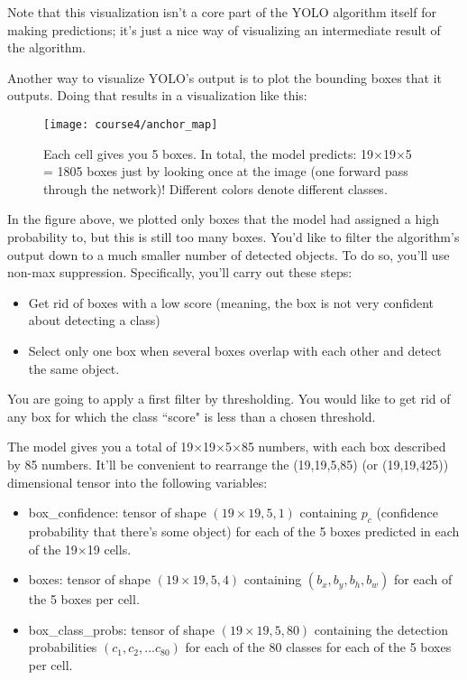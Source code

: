 Note that this visualization isn't a core part of the YOLO algorithm itself for making predictions; it's just a nice way of visualizing an intermediate result of the algorithm.

Another way to visualize YOLO's output is to plot the bounding boxes that it outputs. Doing that results in a visualization like this:
\begin{figure}[h]
\begin{center}
\texttt{[image: course4/anchor\_map]}
\caption{Each cell gives you 5 boxes. In total, the model predicts: 19$\times$19$\times$5 = 1805 boxes just by looking once at the image (one forward pass through the network)! Different colors denote different classes. }
\end{center}
\end{figure}


In the figure above, we plotted only boxes that the model had assigned a high probability to, but this is still too many boxes. You'd like to filter the algorithm's output down to a much smaller number of detected objects. To do so, you'll use non-max suppression. Specifically, you'll carry out these steps:
\begin{itemize}
\item Get rid of boxes with a low score (meaning, the box is not very confident about detecting a class)
\item Select only one box when several boxes overlap with each other and detect the same object.
\end{itemize}



You are going to apply a first filter by thresholding. You would like to get rid of any box for which the class ``score" is less than a chosen threshold. 

The model gives you a total of 19$\times$19$\times$5$\times$85 numbers, with each box described by 85 numbers. It'll be convenient to rearrange the (19,19,5,85) (or (19,19,425)) dimensional tensor into the following variables: 
\begin{itemize} 
\item box\_confidence: tensor of shape $(19 \times 19, 5, 1)$ containing $p_c$ (confidence probability that there's some object) for each of the 5 boxes predicted in each of the 19$\times$19 cells.
\item boxes: tensor of shape $(19 \times 19, 5, 4)$ containing $(b_x, b_y, b_h, b_w)$ for each of the 5 boxes per cell.
\item box\_class\_probs: tensor of shape $(19 \times 19, 5, 80)$ containing the detection probabilities $(c_1, c_2, ... c_{80})$ for each of the 80 classes for each of the 5 boxes per cell.
\end{itemize}

